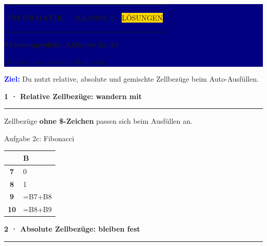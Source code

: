 \documentclass[10pt,a4paper]{article}
\newcommand{\sectiontitle}[1]{%
  \vspace{2.3mm}
  {\color{Blue}\bfseries\large #1}\par
  \vspace{0.8mm}
  {\color{Blue}\rule{\linewidth}{0.7pt}}\par
  \vspace{1.2mm}
}
\newcommand{\gridhead}[1]{\cellcolor{GridHead}\textcolor{Muted}{\bfseries\small #1}}
\newcommand{\gridrow}[1]{\cellcolor{GridHead}\textcolor{Muted}{\bfseries\small #1}}
\newcommand{\sheetsetup}{%
  \arrayrulecolor{GridLine}\setlength{\arrayrulewidth}{0.4pt}%
  \renewcommand{\arraystretch}{1.25}}
\begin{document}
\colorbox{Navy}{%
  \parbox{\dimexpr\linewidth-2\fboxsep\relax}{%
    \vspace{3mm}\color{white}
    \begin{tabularx}{\linewidth}{@{}Xr@{}}
      {\small\bfseries INFORMATIK · KLASSE 9} &
      \colorbox{Gold}{\color{Navy}\small\bfseries\strut LÖSUNGEN}
    \end{tabularx}
    \vspace{2.5mm}

    {\fontsize{22}{25}\selectfont\bfseries Sicherungsblatt: Aufgabe 2a–2d}\par
    \vspace{1mm}
    {\large Relative und absolute Zellbezüge}
    \vspace{3mm}
  }%
}

\vspace{3mm}
\colorbox{Sky}{%
  \parbox{\dimexpr\linewidth-2\fboxsep\relax}{%
    \vspace{1.8mm}
    \textcolor{Blue}{\bfseries Ziel:}
    Du nutzt relative, absolute und gemischte Zellbezüge beim Auto-Ausfüllen.
    \vspace{1.8mm}
  }%
}

\sectiontitle{1 · Relative Zellbezüge: wandern mit}

\begin{minipage}[t]{\dimexpr\linewidth-62mm\relax}
  \vspace{2mm}
  Zellbezüge \textbf{ohne \$-Zeichen} passen sich beim Ausfüllen an.\par
  \vspace{1.5mm}
  {\small Aufgabe 2c: Fibonacci}
\end{minipage}\hfill
\begin{minipage}[t]{56mm}
  \vspace{0pt}
  \sheetsetup
  \begin{tabular}{|c|l|}
    \hline
    \cellcolor{GridHead} & \gridhead{B} \\ \hline
    \gridrow{7} & \small 0 \\ \hline
    \gridrow{8} & \small 1 \\ \hline
    \gridrow{9} & \cellcolor{Cell}\ttfamily\small =B7+B8 \\ \hline
    \gridrow{10} & \ttfamily\small =B8+B9 \\ \hline
  \end{tabular}
\end{minipage}

\sectiontitle{2 · Absolute Zellbezüge: bleiben fest}
\end{document}
